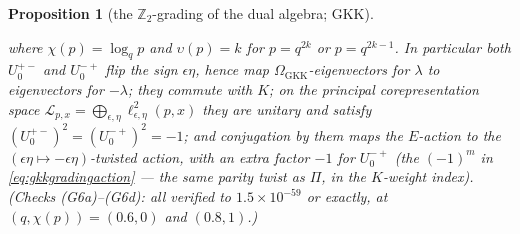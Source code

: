 \documentclass[11pt,a4paper]{article}
\theoremstyle{definition}
\theoremstyle{plain}
\newtheorem{proposition}[definition]{Proposition}
\newcommand{\Z}{\mathbb{Z}}
\begin{document}
\begin{proposition}[the $\Z_2$-grading of the dual algebra; GKK]
\begin{enumerate}[label=(\roman*)]
\begin{equation}
\end{equation}
where $\chi(p)=\log_{q}p$ and $\upsilon(p)=k$ for $p=q^{2k}$ or $p=q^{2k-1}$. In particular
both $U^{+-}_{0}$ and $U^{-+}_{0}$ flip the sign $\epsilon\eta$, hence map
$\Omega_{\mathrm{GKK}}$-eigenvectors for $\lambda$ to eigenvectors for $-\lambda$; they
commute with $K$; on the principal corepresentation space
$\mathcal{L}_{p,x}=\bigoplus_{\epsilon,\eta}\ell^{2}_{\epsilon,\eta}(p,x)$ they are unitary
and satisfy $(U^{+-}_{0})^{2}=(U^{-+}_{0})^{2}=-1$; and conjugation by them maps the
$E$-action to the $(\epsilon\eta\mapsto-\epsilon\eta)$-twisted action, with an extra factor
$-1$ for $U^{-+}_{0}$ (the $(-1)^{m}$ in \eqref{eq:gkkgradingaction} --- the same parity
twist as $\Pi$, in the $K$-weight index). (Checks (G6a)--(G6d): all verified to
$1.5\times10^{-59}$ or exactly, at $(q,\chi(p))=(0.6,0)$ and $(0.8,1)$.)
\end{enumerate}
\end{proposition}
\end{document}
